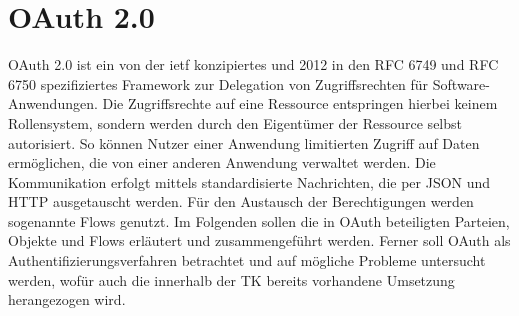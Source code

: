 \chapter{OAuth 2.0} OAuth 2.0 ist ein von der \gls{ietf} konzipiertes und 2012
in den RFC 6749 und RFC 6750 spezifiziertes Framework zur Delegation von
Zugriffsrechten für Software-Anwendungen. Die Zugriffsrechte auf eine Ressource
entspringen hierbei keinem Rollensystem, sondern werden durch den Eigentümer der
Ressource selbst autorisiert. So können Nutzer einer Anwendung limitierten
Zugriff auf Daten ermöglichen, die von einer anderen Anwendung verwaltet werden.
Die Kommunikation erfolgt mittels standardisierte Nachrichten, die per JSON und
HTTP ausgetauscht werden. Für den Austausch der Berechtigungen werden sogenannte
Flows genutzt. Im Folgenden sollen die in OAuth beteiligten Parteien, Objekte
und Flows erläutert und zusammengeführt werden. Ferner soll OAuth als
Authentifizierungsverfahren betrachtet und auf mögliche Probleme untersucht
werden, wofür auch die innerhalb der TK bereits vorhandene Umsetzung
herangezogen wird.





